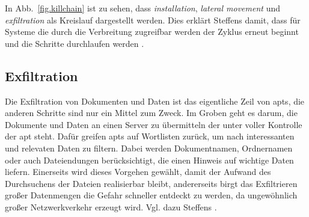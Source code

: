 \documentclass[conference]{IEEEtran}
\begin{document}
In Abb.~\ref{fig.killchain} ist zu sehen, dass \textit{installation}, \textit{lateral movement} und \textit{exfiltration} als Kreislauf dargestellt werden.
Dies erklärt Steffens damit, dass für Systeme die durch die Verbreitung zugreifbar werden der Zyklus erneut beginnt und die Schritte durchlaufen werden \cite[S.~18]{Steffens2020}.

\subsection{Exfiltration}

Die Exfiltration von Dokumenten und Daten ist das eigentliche Zeil von \acp{apt}, die anderen Schritte sind nur ein Mittel zum Zweck.
Im Groben geht es darum, die Dokumente und Daten an einen Server zu übermitteln der unter voller Kontrolle der \ac{apt} steht.
Dafür greifen \acp{apt} auf Wortlisten zurück, um nach interessanten und relevaten Daten zu filtern.
Dabei werden Dokumentnamen, Ordnernamen oder auch Dateiendungen berücksichtigt, die einen Hinweis auf wichtige Daten liefern.
Einerseits wird dieses Vorgehen gewählt, damit der Aufwand des Durchsuchens der Dateien realisierbar bleibt, andererseits birgt das Exfiltrieren großer Datenmengen die Gefahr schneller entdeckt zu werden, da ungewöhnlich großer Netzwerkverkehr erzeugt wird.
Vgl. dazu Steffens \cite[S.~18]{Steffens2020}.
\end{document}

